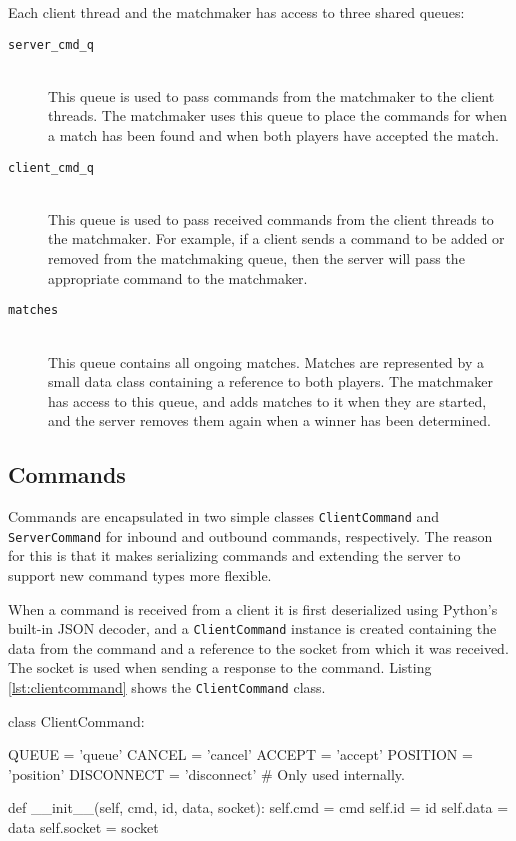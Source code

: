 Each client thread and the matchmaker has access to three shared queues:

\begin{description}
	\item[\texttt{server\_cmd\_q}] \hfill \\
		This queue is used to pass commands from the matchmaker to the client threads.
		The matchmaker uses this queue to place the commands for when a match has been found and when both players have accepted the match.
	\item[\texttt{client\_cmd\_q}] \hfill \\
		This queue is used to pass received commands from the client threads to the matchmaker.
		For example, if a client sends a command to be added or removed from the matchmaking queue, then the server will pass the appropriate command to the matchmaker.
	\item[\texttt{matches}] \hfill \\
		This queue contains all ongoing matches.
		Matches are represented by a small data class containing a reference to both players.
		The matchmaker has access to this queue, and adds matches to it when they are started, and the server removes them again when a winner has been determined.
\end{description}

\subsection{Commands}
Commands are encapsulated in two simple classes \texttt{Client\-Command} and \texttt{Server\-Command} for inbound and outbound commands, respectively.
The reason for this is that it makes serializing commands and extending the server to support new command types more flexible.

When a command is received from a client it is first deserialized using Python's built-in JSON decoder, and a \texttt{Client\-Command} instance is created containing the data from the command and a reference to the socket from which it was received.
The socket is used when sending a response to the command.
Listing \ref{lst:clientcommand} shows the \texttt{Client\-Command} class.

\begin{code}[language={Python}, caption={\texttt{ClientCommand} Class}, label={lst:clientcommand}]
class ClientCommand:

	QUEUE = 'queue'
	CANCEL = 'cancel'
	ACCEPT = 'accept'
	POSITION = 'position'
	DISCONNECT = 'disconnect' # Only used internally.

	def __init__(self, cmd, id, data, socket):
		self.cmd = cmd
		self.id = id
		self.data = data
		self.socket = socket
\end{code}

